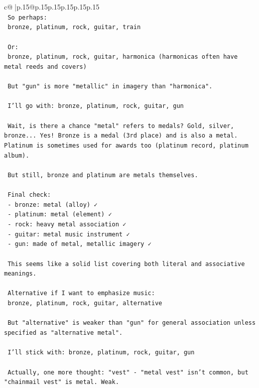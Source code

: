 \documentclass{article}
\begin{document}
{\begin{supertabular}{c@{$\;$}|p{.15\linewidth}@{}p{.15\linewidth}p{.15\linewidth}p{.15\linewidth}p{.15\linewidth}p{.15\linewidth}}
{{{\\ 
\texttt{ So perhaps:} \\
\texttt{ bronze, platinum, rock, guitar, train} \\
\\ 
\texttt{ Or:} \\
\texttt{ bronze, platinum, rock, guitar, harmonica (harmonicas often have metal reeds and covers)} \\
\\ 
\texttt{ But "gun" is more "metallic" in imagery than "harmonica".} \\
\\ 
\texttt{ I'll go with: bronze, platinum, rock, guitar, gun} \\
\\ 
\texttt{ Wait, is there a chance "metal" refers to medals? Gold, silver, bronze... Yes! Bronze is a medal (3rd place) and is also a metal. Platinum is sometimes used for awards too (platinum record, platinum album).} \\
\\ 
\texttt{ But still, bronze and platinum are metals themselves.} \\
\\ 
\texttt{ Final check:} \\
\texttt{ {-} bronze: metal (alloy) ✓} \\
\texttt{ {-} platinum: metal (element) ✓} \\
\texttt{ {-} rock: heavy metal association ✓} \\
\texttt{ {-} guitar: metal music instrument ✓} \\
\texttt{ {-} gun: made of metal, metallic imagery ✓} \\
\\ 
\texttt{ This seems like a solid list covering both literal and associative meanings.} \\
\\ 
\texttt{ Alternative if I want to emphasize music:} \\
\texttt{ bronze, platinum, rock, guitar, alternative} \\
\\ 
\texttt{ But "alternative" is weaker than "gun" for general association unless specified as "alternative metal".} \\
\\ 
\texttt{ I'll stick with: bronze, platinum, rock, guitar, gun} \\
\\ 
\texttt{ Actually, one more thought: "vest" {-} "metal vest" isn't common, but "chainmail vest" is metal. Weak.} \\
}}}
\end{supertabular}}
\end{document}
